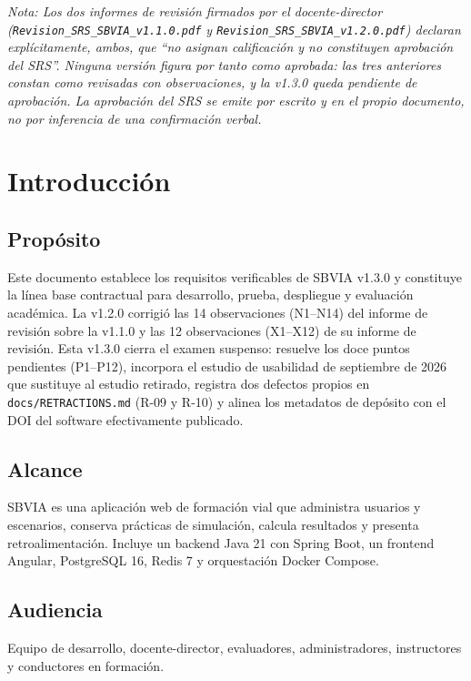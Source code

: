 \documentclass[11pt,a4paper]{article}
\begin{document}
\textit{Nota: Los dos informes de revisión firmados por el docente-director
(\texttt{Revision\_SRS\_SBVIA\_v1.1.0.pdf} y \texttt{Revision\_SRS\_SBVIA\_v1.2.0.pdf}) declaran
explícitamente, ambos, que ``no asignan calificación y no constituyen aprobación del SRS''.
Ninguna versión figura por tanto como aprobada: las tres anteriores constan como revisadas con observaciones, y la v1.3.0 queda pendiente de aprobación.
La aprobación del SRS se emite por escrito y en el propio documento, no por inferencia de una
confirmación verbal.}

\newpage

\section{Introducción}

\subsection{Propósito}
Este documento establece los requisitos verificables de SBVIA v1.3.0 y constituye la línea base contractual para desarrollo, prueba, despliegue y evaluación académica. La v1.2.0 corrigió las 14 observaciones (N1–N14) del informe de revisión sobre la v1.1.0 y las 12 observaciones (X1–X12) de su informe de revisión. Esta v1.3.0 cierra el examen suspenso: resuelve los doce puntos pendientes (P1–P12), incorpora el estudio de usabilidad de septiembre de 2026 que sustituye al estudio retirado, registra dos defectos propios en \texttt{docs/RETRACTIONS.md} (R-09 y R-10) y alinea los metadatos de depósito con el DOI del software efectivamente publicado.

\subsection{Alcance}
SBVIA es una aplicación web de formación vial que administra usuarios y escenarios, conserva prácticas de simulación, calcula resultados y presenta retroalimentación. Incluye un backend Java 21 con Spring Boot, un frontend Angular, PostgreSQL 16, Redis 7 y orquestación Docker Compose.

\subsection{Audiencia}
Equipo de desarrollo, docente-director, evaluadores, administradores, instructores y conductores en formación.
\end{document}
